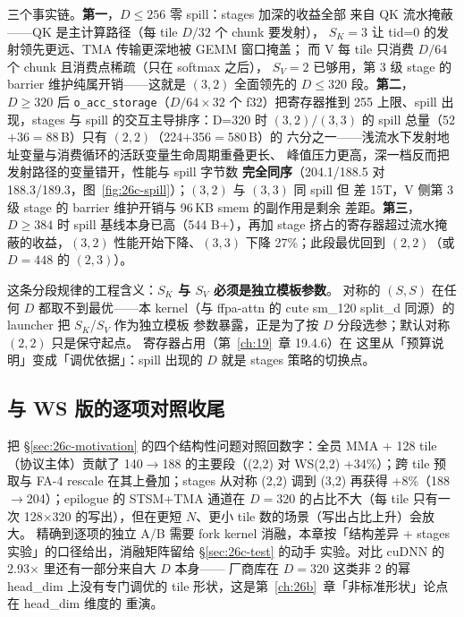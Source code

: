 三个事实链。\textbf{第一}，$D\le256$ 零 spill：stages 加深的收益全部
来自 QK 流水掩蔽——QK 是主计算路径（每 tile $D/32$ 个 chunk 要发射），
$S_K{=}3$ 让 tid=0 的发射领先更远、TMA 传输更深地被 GEMM 窗口掩盖；
而 V 每 tile 只消费 $D/64$ 个 chunk 且消费点稀疏（只在 softmax 之后），
$S_V{=}2$ 已够用，第 3 级 stage 的 barrier 维护纯属开销——这就是
$(3,2)$ 全面领先的 $D\le320$ 段。\textbf{第二}，$D\ge320$ 后
\texttt{o\_acc\_storage}（$D/64 \times 32$ 个 f32）把寄存器推到 255
上限、spill 出现，stages 与 spill 的交互主导排序：D=320 时 $(3,2)/(3,3)$
的 spill 总量（52$+$36$=$88\,B）只有 $(2,2)$（224$+$356$=$580\,B）的
六分之一——浅流水下发射地址变量与消费循环的活跃变量生命周期重叠更长、
峰值压力更高，深一档反而把发射路径的变量错开，性能与 spill 字节数
\textbf{完全同序}（204.1/188.5 对 188.3/189.3，图~\ref{fig:26c-spill}）；$(3,2)$ 与 $(3,3)$ 同 spill 但
差 15T，V 侧第 3 级 stage 的 barrier 维护开销与 96\,KB smem 的副作用是剩余
差距。\textbf{第三}，$D\ge384$ 时 spill 基线本身已高（544 B+），再加
stage 挤占的寄存器超过流水掩蔽的收益，$(3,2)$ 性能开始下降、$(3,3)$ 下降
27\%；此段最优回到 $(2,2)$（或 $D{=}448$ 的 $(2,3)$）。

这条分段规律的工程含义：\textbf{$S_K$ 与 $S_V$ 必须是独立模板参数}。
对称的 $(S,S)$ 在任何 $D$ 都取不到最优——本 kernel（与 ffpa-attn 的
cute sm\_120 split\_d 同源）的 launcher 把 $S_K$/$S_V$ 作为独立模板
参数暴露，正是为了按 $D$ 分段选参；默认对称 $(2,2)$ 只是保守起点。
寄存器占用（第~\ref{ch:19}~章 19.4.6）在
这里从「预算说明」变成「调优依据」：spill 出现的 $D$ 就是 stages
策略的切换点。

\subsection{与 WS 版的逐项对照收尾}

把 \S\ref{sec:26c-motivation} 的四个结构性问题对照回数字：全员 MMA +
128 tile（协议主体）贡献了 140$\to$188 的主要段（(2,2) 对
WS(2,2) +34\%）；跨 tile 预取与 FA-4 rescale 在其上叠加；stages
从对称 (2,2) 调到 (3,2) 再获得 +8\%（188$\to$204）；epilogue 的
STSM+TMA 通道在 $D{=}320$ 的占比不大（每 tile 只有一次 128$\times$320
的写出），但在更短 $N$、更小 tile 数的场景（写出占比上升）会放大。
精确到逐项的独立 A/B 需要 fork kernel 消融，本章按「结构差异 +
stages 实验」的口径给出，消融矩阵留给 \S\ref{sec:26c-test} 的动手
实验。对比 cuDNN 的 2.93$\times$ 里还有一部分来自大 $D$ 本身——
厂商库在 $D{=}320$ 这类非 2 的幂 head\_dim 上没有专门调优的 tile
形状，这是第~\ref{ch:26b}~章「非标准形状」论点在 head\_dim 维度的
重演。

